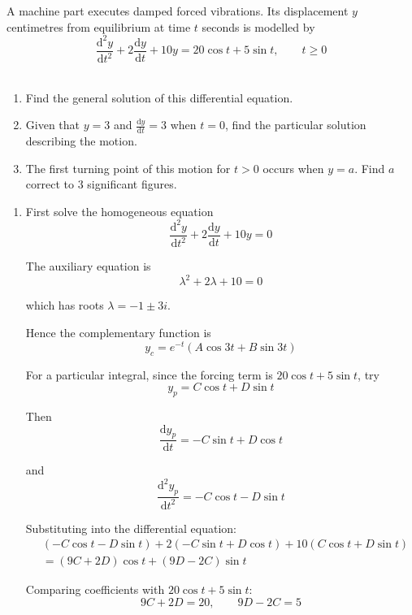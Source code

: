 \documentclass[leqno]{article}
\begin{document}
\begin{enumerate}[
  label=\textbf{\arabic*.},
  leftmargin=*,
  topsep=0pt,
  partopsep=0pt,
  parsep=0pt
]
A machine part executes damped forced vibrations. Its displacement $y$ centimetres from equilibrium at time $t$ seconds is modelled by \\
\[
\frac{\mathrm{d}^2 y}{\mathrm{d}t^2}+2\frac{\mathrm{d}y}{\mathrm{d}t}+10y=20\cos t+5\sin t,\qquad t\ge 0
\] \\
\begin{enumerate}[label=\textbf{(\alph*)}]
  \item Find the general solution of this differential equation.  \\
  \item Given that $y=3$ and $\frac{\mathrm{d}y}{\mathrm{d}t}=3$ when $t=0$, find the particular solution describing the motion.  \\
  \item The first turning point of this motion for $t>0$ occurs when $y=a$. Find $a$ correct to $3$ significant figures.  \\
\end{enumerate}

\vspace*{10pt}

\begin{djsSolution}
\begin{enumerate}[label=\textbf{(\alph*)}]
  \item First solve the homogeneous equation
\[
\frac{\mathrm{d}^2y}{\mathrm{d}t^2}+2\frac{\mathrm{d}y}{\mathrm{d}t}+10y=0
\]

The auxiliary equation is
\[
\lambda^2+2\lambda+10=0
\]

which has roots \(\lambda=-1\pm 3i\).

Hence the complementary function is
\[
y_c=e^{-t}(A\cos 3t+B\sin 3t)
\]

For a particular integral, since the forcing term is \(20\cos t+5\sin t\), try
\[
y_p=C\cos t+D\sin t
\]

Then
\[
\frac{\mathrm{d}y_p}{\mathrm{d}t}=-C\sin t+D\cos t
\]

and
\[
\frac{\mathrm{d}^2y_p}{\mathrm{d}t^2}=-C\cos t-D\sin t
\]

Substituting into the differential equation:
\begin{align*}
&(-C\cos t-D\sin t)+2(-C\sin t+D\cos t)+10(C\cos t+D\sin t)\\
&=(9C+2D)\cos t+(9D-2C)\sin t
\end{align*}

Comparing coefficients with \(20\cos t+5\sin t\):
\[
9C+2D=20,\qquad 9D-2C=5
\]


\end{enumerate}
\end{djsSolution}
\end{enumerate}
\end{document}

